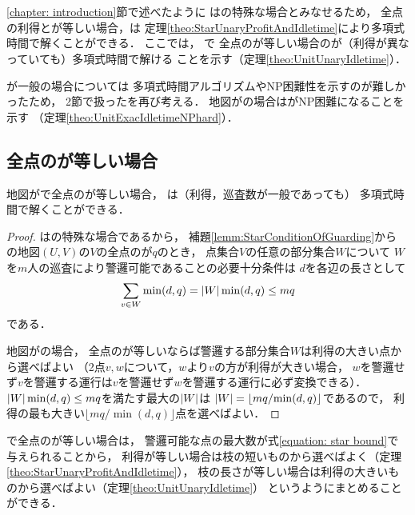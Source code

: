 \chapter{{\graphUnit}}
\label{chapter: unit}

\ref{chapter: introduction}節で述べたように
{\graphUnit}は{\graphStar}の特殊な場合とみなせるため，
全点の利得と{\maxIdletime}が等しい場合，{\patProb}は
定理\ref{theo:StarUnaryProfitAndIdletime}により多項式時間で解くことができる．
ここでは，
{\graphUnit}で
全点の{\maxIdletime}が等しい場合の{\patProb}が（利得が異なっていても）多項式時間で解ける
ことを示す（定理\ref{theo:UnitUnaryIdletime}）．

{\maxIdletime}が一般の場合については
多項式時間アルゴリズムやNP困難性を示すのが難しかったため，
2節で扱った{\timeSpecifiedPatProb}を再び考える．
地図が{\graphUnit}の場合は{\timeSpecifiedPatProb}がNP困難になることを示す
（定理\ref{theo:UnitExacIdletimeNPhard}）．



\section{全点の{\maxIdletime}が等しい場合}

\begin{theo}
  \label{theo:UnitUnaryIdletime}
  地図が{\graphUnit}で全点の{\maxIdletime}が等しい場合，
  {\patProb}は（利得，巡査数が一般であっても）
  多項式時間で解くことができる．
\end{theo}

\begin{proof}
  {\graphUnit}は{\graphStar}の特殊な場合であるから，
  補題\ref{lemm:StarConditionOfGuarding}から
  {\graphUnit}の地図$(U, V)$の$V$の全点の{\maxIdletime}が$q$のとき，
  点集合$V$の任意の部分集合$W$について
  $W$を$m$人の巡査により警邏可能であることの必要十分条件は
  $d$を各辺の長さとして
  \[
    \sum_{v \in W} \min(d, q) = \lvert{W}\rvert\min(d, q) \leq mq
  \]
  である．

  地図が{\graphUnit}の場合，
  全点の{\maxIdletime}が等しいならば警邏する部分集合$W$は利得の大きい点から選べばよい
  （2点$v, w$について，$w$より$v$の方が利得が大きい場合，
  $w$を警邏せず$v$を警邏する運行は$v$を警邏せず$w$を警邏する運行に必ず変換できる）．
  $\lvert{W}\rvert\min(d, q) \leq mq$を満たす最大の$\lvert{W}\rvert$は
  $\lvert{W}\rvert = \left\lfloor {mq}/{\min(d, q)} \right\rfloor$であるので，
  利得の最も大きい$\lfloor {mq}/{\min(d, q)} \rfloor$点を選べばよい．
\end{proof}

{\graphStar}で全点の{\maxIdletime}が等しい場合は，
警邏可能な点の最大数が式\eqref{equation: star bound}で与えられることから，
利得が等しい場合は枝の短いものから選べばよく（定理\ref{theo:StarUnaryProfitAndIdletime}），
枝の長さが等しい場合は利得の大きいものから選べばよい（定理\ref{theo:UnitUnaryIdletime}）
というようにまとめることができる．



